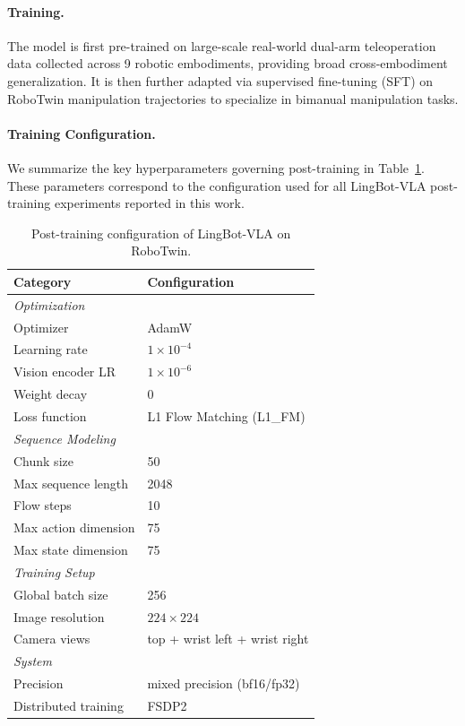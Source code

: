 \documentclass{article}
\begin{document}
\paragraph{Training.}
The model is first pre-trained on large-scale real-world dual-arm teleoperation data collected across 9 robotic embodiments, providing broad cross-embodiment generalization. It is then further adapted via supervised fine-tuning (SFT) on RoboTwin manipulation trajectories to specialize in bimanual manipulation tasks.

\paragraph{Training Configuration.}
We summarize the key hyperparameters governing post-training in Table~\ref{tab:lingbot_hyperparams}. These parameters correspond to the configuration used for all LingBot-VLA post-training experiments reported in this work.

\begin{table}[h]
\centering
\caption{Post-training configuration of LingBot-VLA on RoboTwin.}
\label{tab:lingbot_hyperparams}
\begin{tabular}{ll}
\toprule
\textbf{Category} & \textbf{Configuration} \\
\midrule
\multicolumn{2}{l}{\textit{Optimization}} \\
Optimizer & AdamW \\
Learning rate & $1 \times 10^{-4}$ \\
Vision encoder LR & $1 \times 10^{-6}$ \\
Weight decay & 0 \\
Loss function & L1 Flow Matching (L1\_FM) \\
\midrule
\multicolumn{2}{l}{\textit{Sequence Modeling}} \\
Chunk size & 50 \\
Max sequence length & 2048 \\
Flow steps & 10 \\
Max action dimension & 75 \\
Max state dimension & 75 \\
\midrule
\multicolumn{2}{l}{\textit{Training Setup}} \\
Global batch size & 256 \\
Image resolution & $224 \times 224$ \\
Camera views & top + wrist left + wrist right \\
\midrule
\multicolumn{2}{l}{\textit{System}} \\
Precision & mixed precision (bf16/fp32) \\
Distributed training & FSDP2 \\
\bottomrule
\end{tabular}
\end{table}
\end{document}
